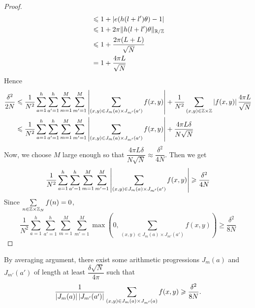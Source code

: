 \begin{proof}
\begin{align*}
	& \leqslant 1 + \left\vert{e(h(l+l')\theta) - 1}\right\vert  \\
	& \leqslant 1 + 2\pi  \| h(l+l')\theta \|_{{\mathbb R} /{\mathbb Z}} \\
	& \leqslant 1 + \dfrac{2 \pi  (L+L)} {\sqrt{N}} \\
	& = 1 + \dfrac{4 \pi L}{\sqrt{N}} 
	\end{align*}
	Hence
	\begin{align*}
	\dfrac{\delta^2}{2N} 
	&\leqslant \dfrac{1}{N^2} \sum\limits_{a = 1}^h \sum\limits_{a' = 1} ^h \sum\limits_{m = 1}^M \sum\limits_{m' = 1}^M \left\vert{\sum\limits_{(x,y) \in J_m(a) \times J_{m'}(a')} f(x,y)}\right\vert + \dfrac{1}{N^2} \sum\limits_{(x,y) \in {\mathbb Z} \times {\mathbb Z}} \left\vert{f(x,y)}\right\vert \dfrac{4 \pi L}{\sqrt{N}} \\
	& \leqslant  \dfrac{1}{N^2} \sum\limits_{a = 1}^h \sum\limits_{a' = 1} ^h \sum\limits_{m = 1}^M \sum\limits_{m' = 1}^M \left\vert{\sum\limits_{(x,y) \in J_m(a) \times J_{m'}(a')} f(x,y)}\right\vert + \dfrac{4 \pi L \delta}{N\sqrt{N}}	
	\end{align*}
	Now, we choose $ M $ large enough so that $ \dfrac{4 \pi L \delta}{N\sqrt{N}} \approx \dfrac{\delta^2}{4N} $. Then we get
	$$ \dfrac{1}{N^2}\sum\limits_{a = 1}^h \sum\limits_{a' = 1} ^h \sum\limits_{m = 1}^M \sum\limits_{m' = 1}^M \left\vert{\sum\limits_{(x,y) \in J_m(a) \times J_{m'}(a')} f(x,y)}\right\vert \geqslant \dfrac{\delta^2}{4N} $$
	Since $ \sum\limits_{n \in {\mathbb Z} \times {\mathbb Z}_N} f(n) = 0  $, 
	$$ \dfrac{1}{N^2}\sum\limits_{a = 1}^h \sum\limits_{a' = 1} ^h \sum\limits_{m = 1}^M \sum\limits_{m' = 1}^M \max \left(0, \sum\limits_{(x,y) \in J_m(a) \times J_{m'}(a')} f(x,y) \right) \geq \dfrac{\delta^2}{8N} $$
\end{proof}
	
	\noindent By averaging argument, there exist some arithmetic progressions $ J_m(a) $ and $ J_{m'}(a') $ of length at least $ \dfrac{\delta \sqrt{N}}{4\pi} $ such that 
	$$ \dfrac{1}{\left\vert{J_m(a)}\right\vert \left\vert{J_{m'}(a')}\right\vert} \sum\limits_{(x,y) \in J_m(a) \times J_{m'}(a)} f(x,y) \geqslant \dfrac{\delta^2}{8N} .$$

